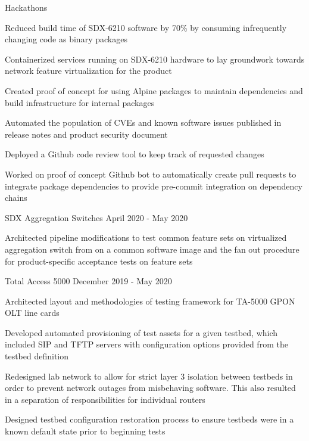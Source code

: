
\begin{cventries}
  \cventry
    {} {Hackathons} {} {} {
      \begin{cvitems}
        \item {Reduced build time of SDX-6210 software by 70\% by consuming infrequently changing code as binary packages}
        \item {Containerized services running on SDX-6210 hardware to lay groundwork towards network feature virtualization for the product}
        \item {Created proof of concept for using Alpine packages to maintain dependencies and build infrastructure for internal packages}
        \item {Automated the population of CVEs and known software issues published in release notes and product security document}
        \item {Deployed a Github code review tool to keep track of requested changes}
        \item {Worked on proof of concept Github bot to automatically create pull requests to integrate package dependencies to provide pre-commit integration on dependency chains}
      \end{cvitems}
    }

  \cventry
    {} {SDX Aggregation Switches} {} {April 2020 - May 2020} {
      \begin{cvitems}
        \item {Architected pipeline modifications to test common feature sets on virtualized aggregation switch from on a common software image and the fan out procedure for product-specific acceptance tests on feature sets}
      \end{cvitems}
    }
  \cventry
    {} {Total Access 5000} {} {December 2019 - May 2020} {
      \begin{cvitems}
        \item {Architected layout and methodologies of testing framework for TA-5000 GPON OLT line cards}
        \item {Developed automated provisioning of test assets for a given testbed, which included SIP and TFTP servers with configuration options provided from the testbed definition}
        \item {Redesigned lab network to allow for strict layer 3 isolation between testbeds in order to prevent network outages from misbehaving software. This also resulted in a separation of responsibilities for individual routers}
        \item {Designed testbed configuration restoration process to ensure testbeds were in a known default state prior to beginning tests}
      \end{cvitems}
    }


\end{cventries}
